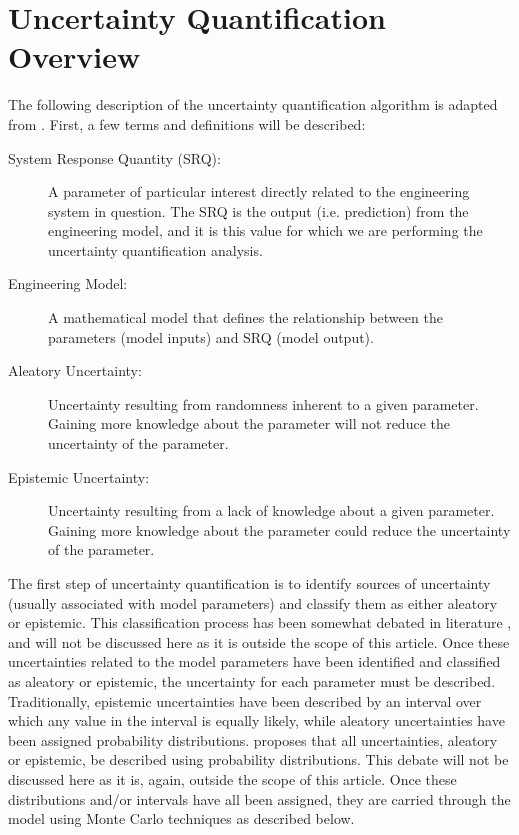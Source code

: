 \documentclass[11pt]{asaproc}\usepackage[]{graphicx}\usepackage[]{color}
\begin{document}
\section{Uncertainty Quantification Overview}  
\label{UQOverview}

The following description of the uncertainty quantification algorithm is adapted from \cite{EW2018}. First, a few terms and definitions will be described: 

\begin{description}
\item[System Response Quantity (SRQ):] A parameter of particular interest directly related to the engineering system in question. The SRQ is the output (i.e. prediction) from the engineering model, and it is this value for which we are performing the uncertainty quantification analysis.
\item[Engineering Model:] A mathematical model that defines the relationship between the parameters (model inputs) and SRQ (model output). 
\item[Aleatory Uncertainty:] Uncertainty resulting from randomness inherent to a given parameter. Gaining more knowledge about the parameter will not reduce the uncertainty of the parameter. 
\item[Epistemic Uncertainty:] Uncertainty resulting from a lack of knowledge about a given parameter. Gaining more knowledge about the parameter could reduce the uncertainty of the parameter. 
\end{description}

The first step of uncertainty quantification is to identify sources of uncertainty (usually associated with model parameters) and classify them as either aleatory or epistemic. This classification process has been somewhat debated in literature \citep{KD2009}, and will not be discussed here as it is outside the scope of this article. Once these uncertainties related to the model parameters have been identified and classified as aleatory or epistemic, the uncertainty for each parameter must be described. Traditionally, epistemic uncertainties have been described by an interval over which any value in the interval is equally likely, while aleatory uncertainties have been assigned probability distributions. \cite{EW2018} proposes that all uncertainties, aleatory or epistemic, be described using probability distributions. This debate will not be discussed here as it is, again, outside the scope of this article. Once these distributions and/or intervals have all been assigned, they are carried through the model using Monte Carlo techniques as described below.
\end{document}
